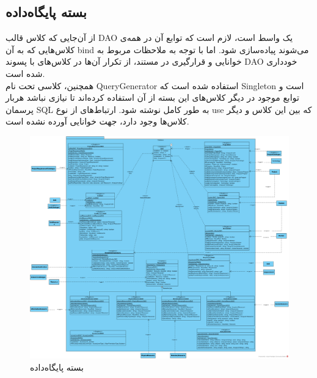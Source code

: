 \begin{landscape}
	\section{بسته پایگاه‌داده}
	از آن‌جایی که کلاس قالب
	DAO یک واسط است، لازم است که توابع آن در همه‌ی کلاس‌هایی که به آن bind می‌شوند پیاده‌سازی شود. اما با توجه به ملاحظات مربوط به خوانایی و قرارگیری در مستند، از تکرار آن‌ها در کلاس‌های با پسوند DAO خودداری شده است.
	\\
	همچنین، کلاسی تحت نام QueryGenerator استفاده شده است که Singleton است و توابع موجود در دیگر کلاس‌های این بسته از آن استفاده کرده‌اند تا نیازی نباشد هربار پرسمان SQL به طور کامل نوشته شود. ارتباط‌های از نوع use که بین این کلاس و دیگر کلاس‌ها وجود دارد، جهت خوانایی آورده نشده است.
	\begin{figure}[H]
		\centering
		\includegraphics[scale=0.4]{img/class-design/DatabasePackage}
		\caption{بسته پایگاه‌داده}
	\end{figure}
\end{landscape}


